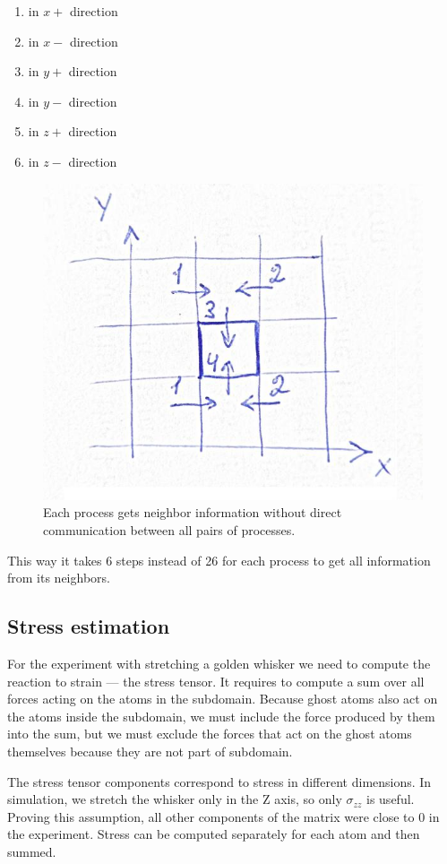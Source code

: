 \documentclass[12pt,a4paper]{article}
\begin{document}
\begin{enumerate}
	\item in $x+$ direction
	\item in $x-$ direction
	\item in $y+$ direction
	\item in $y-$ direction
	\item in $z+$ direction
	\item in $z-$ direction
\end{enumerate}

\begin{figure}[h!]
	\centering
	\includegraphics[width=.5\linewidth]{img/milestone08-domain-communication.jpg}
	\caption{Each process gets neighbor information without direct communication between all pairs of processes.}
	\label{fig:domain-communication}
\end{figure}

This way it takes 6 steps instead of 26 for each process to get all information from its neighbors.

\subsection*{Stress estimation}

For the experiment with stretching a golden whisker we need to compute the reaction to strain --- the stress tensor. It requires to compute a sum over all forces acting on the atoms in the subdomain. Because ghost atoms also act on the atoms inside the subdomain, we must include the force produced by them into the sum, but we must exclude the forces that act on the ghost atoms themselves because they are not part of subdomain.

The stress tensor components correspond to stress in different dimensions. In simulation, we stretch the whisker only in the Z axis, so only $\sigma_{zz}$ is useful. Proving this assumption, all other components of the matrix were close to 0 in the experiment. Stress can be computed separately for each atom and then summed.
\end{document}
